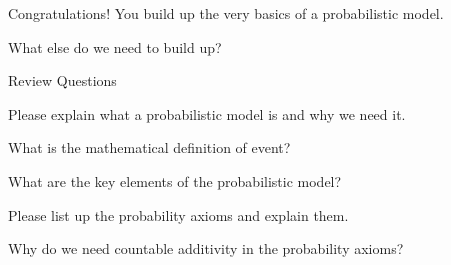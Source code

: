 \documentclass[fleqn,aspectratio=169]{beamer}
\begin{document}
\begin{frame}{}
\vspace{2cm}


\medskip
\LARGE Congratulations! You build up the very basics of a probabilistic model. 

\medskip

\LARGE What else do we need to build up?
\end{frame}

\begin{frame}{Review Questions}
\bce[1)]
\item Please explain what a probabilistic model is and why we need it. 

\item What is the mathematical definition of event?

\item What are the key elements of the probabilistic model?

\item Please list up the probability axioms and explain them. 

\item Why do we need countable additivity in the probability axioms?

\ece
\end{frame}
\end{document}
